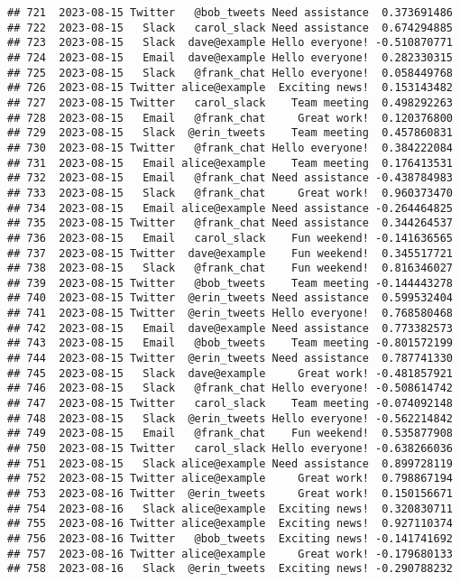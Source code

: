 \documentclass[
]{article}
\begin{document}
\begin{verbatim}
## 721  2023-08-15 Twitter   @bob_tweets Need assistance  0.373691486
## 722  2023-08-15   Slack   carol_slack Need assistance  0.674294885
## 723  2023-08-15   Slack  dave@example Hello everyone! -0.510870771
## 724  2023-08-15   Email  dave@example Hello everyone!  0.282330315
## 725  2023-08-15   Slack   @frank_chat Hello everyone!  0.058449768
## 726  2023-08-15 Twitter alice@example  Exciting news!  0.153143482
## 727  2023-08-15 Twitter   carol_slack    Team meeting  0.498292263
## 728  2023-08-15   Email   @frank_chat     Great work!  0.120376800
## 729  2023-08-15   Slack  @erin_tweets    Team meeting  0.457860831
## 730  2023-08-15 Twitter   @frank_chat Hello everyone!  0.384222084
## 731  2023-08-15   Email alice@example    Team meeting  0.176413531
## 732  2023-08-15   Email   @frank_chat Need assistance -0.438784983
## 733  2023-08-15   Slack   @frank_chat     Great work!  0.960373470
## 734  2023-08-15   Email alice@example Need assistance -0.264464825
## 735  2023-08-15 Twitter   @frank_chat Need assistance  0.344264537
## 736  2023-08-15   Email   carol_slack    Fun weekend! -0.141636565
## 737  2023-08-15 Twitter  dave@example    Fun weekend!  0.345517721
## 738  2023-08-15   Slack   @frank_chat    Fun weekend!  0.816346027
## 739  2023-08-15 Twitter   @bob_tweets    Team meeting -0.144443278
## 740  2023-08-15 Twitter  @erin_tweets Need assistance  0.599532404
## 741  2023-08-15 Twitter  @erin_tweets Hello everyone!  0.768580468
## 742  2023-08-15   Email  dave@example Need assistance  0.773382573
## 743  2023-08-15   Email   @bob_tweets    Team meeting -0.801572199
## 744  2023-08-15 Twitter  @erin_tweets Need assistance  0.787741330
## 745  2023-08-15   Slack  dave@example     Great work! -0.481857921
## 746  2023-08-15   Slack   @frank_chat Hello everyone! -0.508614742
## 747  2023-08-15 Twitter   carol_slack    Team meeting -0.074092148
## 748  2023-08-15   Slack  @erin_tweets Hello everyone! -0.562214842
## 749  2023-08-15   Email   @frank_chat    Fun weekend!  0.535877908
## 750  2023-08-15 Twitter   carol_slack Hello everyone! -0.638266036
## 751  2023-08-15   Slack alice@example Need assistance  0.899728119
## 752  2023-08-15 Twitter alice@example     Great work!  0.798867194
## 753  2023-08-16 Twitter  @erin_tweets     Great work!  0.150156671
## 754  2023-08-16   Slack alice@example  Exciting news!  0.320830711
## 755  2023-08-16 Twitter alice@example  Exciting news!  0.927110374
## 756  2023-08-16 Twitter   @bob_tweets  Exciting news! -0.141741692
## 757  2023-08-16 Twitter alice@example     Great work! -0.179680133
## 758  2023-08-16   Slack  @erin_tweets  Exciting news! -0.290788232

\end{verbatim}
\end{document}
